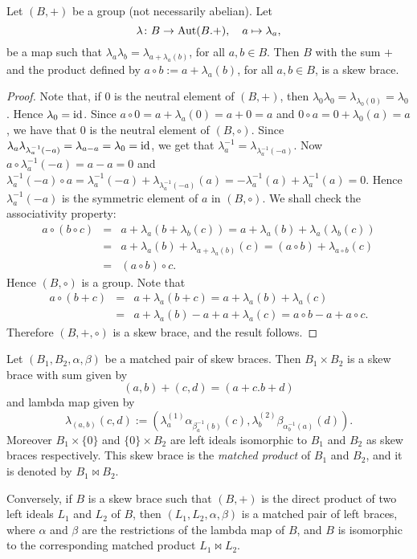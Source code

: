 \begin{lemma} \label{lemma:lambda}
	Let $(B,+)$ be a group (not necessarily abelian). Let
	$$\lambda\colon B\rightarrow \operatorname{Aut}(B.+),\quad a\mapsto \lambda_a,$$ 
	be a map such that
	$\lambda_a\lambda_b=\lambda_{a+\lambda_a(b)}$, for all $a,b\in B$. Then $B$ with the sum $+$ and the product defined by $a\circ b:=a+\lambda_a(b)$, for all $a,b\in B$, is a skew brace.	
\end{lemma}	

\begin{proof}
	Note that, if $0$ is the neutral element of $(B,+)$, then $\lambda_0\lambda_0=\lambda_{\lambda_0(0)}=\lambda_0$. Hence
	$\lambda_0=\operatorname{id}$. Since $a\circ 0=a+\lambda_a(0)=a+0=a$ and $0\circ a=0+\lambda_0(a)=a$, we have that $0$ is the neutral element of $(B,\circ)$. Since $\lambda_a\lambda_{\lambda^{-1}_{a}(-a)}=\lambda_{a-a}=\lambda_0=\operatorname{id}$, we get that $\lambda^{-1}_a=\lambda_{\lambda^{-1}_a(-a)}$. Now $a\circ \lambda^{-1}_{a}(-a)=a-a=0$ and $\lambda^{-1}_a(-a)\circ a=\lambda^{-1}_a(-a)+\lambda_{\lambda^{-1}_a(-a)}(a)=-\lambda^{-1}_a(a)+\lambda^{-1}_{a}(a)=0$. Hence $\lambda^{-1}_a(-a)$ is the symmetric element of $a$ in $(B,\circ)$. We shall check the associativity property:
	\begin{eqnarray*}
		a\circ (b\circ c)&=&a+\lambda_a(b+\lambda_b(c))=a+\lambda_a(b)+\lambda_a(\lambda_b(c))\\
		&=&a+\lambda_a(b)+\lambda_{a+\lambda_a(b)}(c)=(a\circ b)+\lambda_{a\circ b}(c)\\
		&=&(a\circ b)\circ c.
	\end{eqnarray*}
Hence $(B,\circ)$ is a group. Note that
\begin{eqnarray*}
	a\circ (b+c)&=&a+\lambda_a(b+c)=a+\lambda_a(b)+\lambda_a(c)\\
	&=&a+\lambda_a(b)-a+a+\lambda_a(c)=a\circ b-a+a\circ c.
\end{eqnarray*}
Therefore $(B,+,\circ)$ is a skew brace, and the result follows.
\end{proof}

\begin{theorem}\label{thm:matchedproduct}
	Let $(B_1,B_2,\alpha,\beta)$ be a matched pair of skew braces. Then $B_1\times B_2$ is a skew brace with sum given by
	$$(a,b)+(c,d)=(a+c.b+d)$$
and lambda map given by
$$\lambda_{(a,b)}(c,d):=\left( \lambda^{(1)}_{a}\alpha_{\beta^{-1}_a(b)}(c), \lambda^{(2)}_{b}\beta_{\alpha^{-1}_b(a)}(d)\right).$$
Moreover $B_1\times \{0\}$ and $\{0\}\times B_2$ are left ideals isomorphic to $B_1$ and $B_2$ as skew braces respectively.
This skew brace is  the \emph{matched product} of $B_1$ and $B_2$, and it is denoted by $B_1\bowtie B_2$.

Conversely, if $B$ is a skew brace such that $(B,+)$ is the direct product of two left ideals $L_1$ and $L_2$ of $B$, then $(L_1,L_2,\alpha,\beta)$ is a matched pair of left braces, where $\alpha$ and $\beta$ are the restrictions of the lambda map of $B$, and $B$  is isomorphic to the corresponding matched product $L_1\bowtie L_2$.   	
\end{theorem}	

